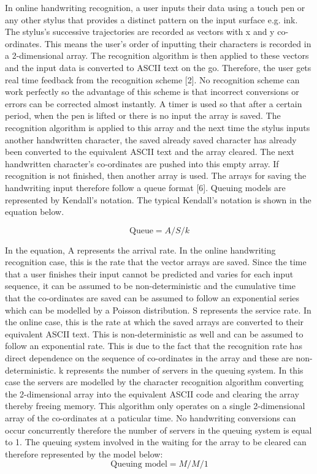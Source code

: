 In online handwriting recognition, a user inputs their data using a touch pen or any other stylus that provides a distinct pattern on the input surface e.g. ink. The stylus’s successive trajectories are recorded as vectors with x and y co-ordinates. This means the user’s order of inputting their characters is recorded in a 2-dimensional array. The recognition algorithm is then applied to these vectors and the input data is converted to ASCII text on the go. Therefore, the user gets real time feedback from the recognition scheme [2]. No recognition scheme can work perfectly so the advantage of this scheme is that incorrect conversions or errors can be corrected almost instantly. A timer is used so that after a certain period, when the pen is lifted or there is no input the array is saved. The recognition algorithm is applied to this array and the next time the stylus inputs another handwritten character, the saved already saved character has already been converted to the equivalent ASCII text and the array cleared. The next handwritten character’s co-ordinates are pushed into this empty array. If recognition is not finished, then another array is used. The arrays for saving the handwriting input therefore follow a queue format [6]. Queuing models are represented by Kendall’s notation. The typical Kendall’s notation is shown in the equation below.

\begin{equation}
	\text{Queue} = A/S/k
\end{equation}

In the equation, A represents the arrival rate. In the online handwriting recognition case, this is the rate that the vector arrays are saved. Since the time that a user finishes their input cannot be predicted and varies for each input sequence, it can be assumed to be non-deterministic and the cumulative time that the co-ordinates are saved can be assumed to follow an exponential series which can be modelled by a Poisson distribution. S represents the service rate. In the online case, this is the rate at which the saved arrays are converted to their equivalent ASCII text. This is non-deterministic as well and can be assumed to follow an exponential rate. This is due to the fact that the recognition rate has direct dependence on the sequence of co-ordinates in the array and these are non-deterministic. k represents the number of servers in the queuing system.  In this case the servers are modelled by the character recognition algorithm converting the 2-dimensional array into the equivalent ASCII code and clearing the array thereby freeing memory. This algorithm only operates on a single 2-dimensional array of the co-ordinates at a paticular time. No handwriting conversions can occur concurrently therefore the number of servers in the queuing system is equal to 1. The queuing system involved in the waiting for the array to be cleared can therefore represented by the model below:\\
\begin{equation}
	\text{Queuing model} = M/M/1
\end{equation}

